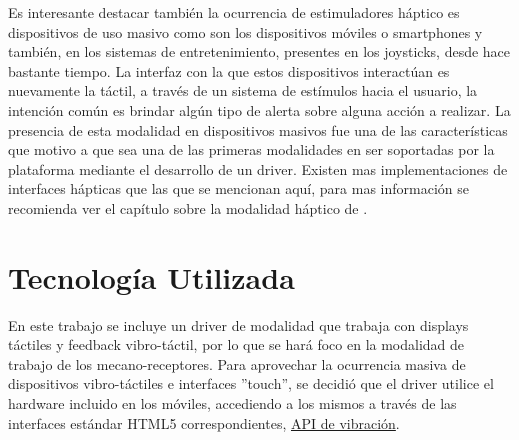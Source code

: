 Es interesante destacar también la ocurrencia de estimuladores háptico es dispositivos de uso masivo como son los dispositivos móviles o smartphones y también, en los sistemas de entretenimiento, presentes en los joysticks, desde hace bastante tiempo. La interfaz con la que estos dispositivos interactúan es nuevamente la táctil, a través de un sistema de estímulos hacia el usuario, la intención común es brindar algún tipo de alerta sobre alguna acción a realizar.
La presencia de esta modalidad en dispositivos masivos fue una de las características que motivo a que sea una de las primeras modalidades en ser soportadas por la plataforma mediante el desarrollo de un driver.
Existen mas implementaciones de interfaces hápticas que las que se mencionan aquí, para mas información se recomienda ver el capítulo sobre la modalidad háptico de \citet{kortum2008hci}.

\section{Tecnología Utilizada}
En este trabajo se incluye un driver de modalidad que trabaja con displays táctiles y feedback vibro-táctil, por lo que se hará foco en la modalidad de trabajo de los mecano-receptores.
Para aprovechar la ocurrencia masiva de dispositivos vibro-táctiles e interfaces ''touch'', se decidió que el driver utilice el hardware incluido en los móviles, accediendo a los mismos a través de las interfaces estándar HTML5 correspondientes, \eg  \href{http://www.w3.org/TR/vibration/}{API de vibración}.
